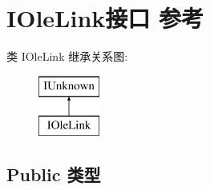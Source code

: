 \hypertarget{interface_i_ole_link}{}\section{I\+Ole\+Link接口 参考}
\label{interface_i_ole_link}
类 I\+Ole\+Link 继承关系图\+:\begin{figure}[H]
\begin{center}
\leavevmode
\includegraphics[height=2.000000cm]{interface_i_ole_link}
\end{center}
\end{figure}
\subsection*{Public 类型}
